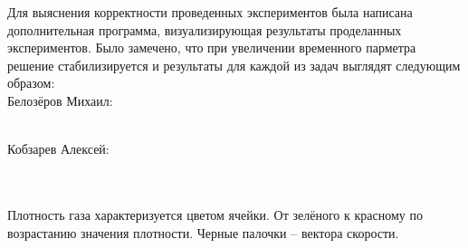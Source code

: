 \documentclass[a4paper, 25pt]{article}
\begin{document}
Для выяснения корректности проведенных экспериментов была написана дополнительная программа, визуализирующая результаты проделанных экспериментов. Было замечено, что при увеличении временного парметра решение стабилизируется и результаты для каждой из задач выглядят следующим образом: \\
Белозёров Михаил:
\begin{figure}[h!]
\end{figure}
\\
\newpage
Кобзарев Алексей:
\begin{figure}[h!]
\end{figure}
\\
\\
Плотность газа характеризуется цветом ячейки. От зелёного к красному по возрастанию значения плотности. Черные палочки -- вектора скорости.
\end{document}
